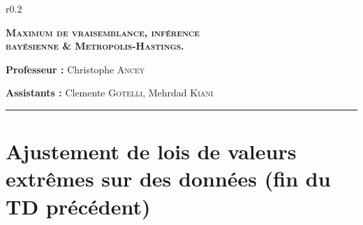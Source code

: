 \documentclass[a4paper]{article}
\begin{document}
\pagestyle{fancy}
\fancyhead{}

\begin{wrapfigure}{r}{0.2\textwidth}
\vspace{-40pt}
  \begin{center}
  \end{center}
   \vspace{-80pt}
\end{wrapfigure}
\huge
\textsc{\textbf{Maximum de vraisemblance,  inférence \\bayésienne \& Metropolis-Hastings.}}


\small

    \vspace{10pt}
\textbf{Professeur :} Christophe \textsc{Ancey} 

    \vspace{10pt}
   \textbf{Assistants :} Clemente \textsc{Gotelli}, Mehrdad \textsc{Kiani} \\
    \vspace{10pt}
\hrule
\small

 \section{Ajustement de lois de valeurs extrêmes sur des données (fin du TD précédent)}
\end{document}
